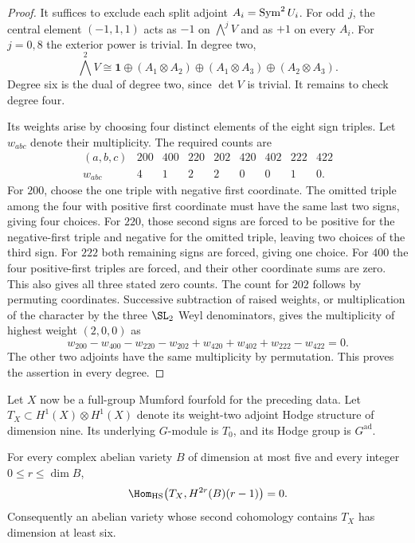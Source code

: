 \begin{proof}
It suffices to exclude each split adjoint
$A_i=\operatorname{Sym}^2U_i$. For odd $j$, the central element
$(-1,1,1)$ acts as $-1$ on $\bigwedge^jV$ and as $+1$ on
every $A_i$. For $j=0,8$ the exterior power is trivial.
In degree two,
\[
 \bigwedge^2V\cong\mathbf1\oplus
 (A_1\otimes A_2)\oplus(A_1\otimes A_3)
                         \oplus(A_2\otimes A_3).
\]
Degree six is the dual of degree two, since $\det V$ is
trivial. It remains to check degree four.

Its weights arise by choosing four distinct elements of the
eight sign triples. Let $w_{abc}$ denote their multiplicity.
The required counts are
\[
\begin{array}{c|rrrrrrrr}
(a,b,c)&200&400&220&202&420&402&222&422\\\hline
w_{abc}&4&1&2&2&0&0&1&0.
\end{array}
\]
For $200$, choose the one triple with negative first
coordinate. The omitted triple among the four with positive
first coordinate must have the same last two signs, giving
four choices. For $220$, those second signs are forced to be
positive for the negative-first triple and negative for the
omitted triple, leaving two choices of the third sign.
For $222$ both remaining signs are forced, giving one choice.
For $400$ the four positive-first triples are forced, and
their other coordinate sums are zero. This also gives all
three stated zero counts. The count for $202$ follows by
permuting coordinates.
Successive subtraction of raised weights, or multiplication
of the character by the three $\SL_2$ Weyl denominators,
gives the multiplicity of highest weight $(2,0,0)$ as
\[
 w_{200}-w_{400}-w_{220}-w_{202}
       +w_{420}+w_{402}+w_{222}-w_{422}=0.
\]
The other two adjoints have the same multiplicity by
permutation. This proves the assertion in every degree.
\end{proof}

Let $X$ now be a full-group Mumford fourfold for the preceding
data. Let $T_X\subset H^1(X)\otimes H^1(X)$ denote its
weight-two adjoint Hodge structure of dimension nine. Its
underlying $G$-module is $T_0$, and its Hodge group is
$G^{\mathrm{ad}}$.

\begin{theorem}\label{round26:carrier:minimal}
For every complex abelian variety $B$ of dimension at most
five and every integer $0\le r\le\dim B$,
\[
 \Hom_{\mathrm{HS}}
       \bigl(T_X,H^{2r}(B)(r-1)\bigr)=0.
\]
Consequently an abelian variety whose second cohomology
contains $T_X$ has dimension at least six.
\end{theorem}

